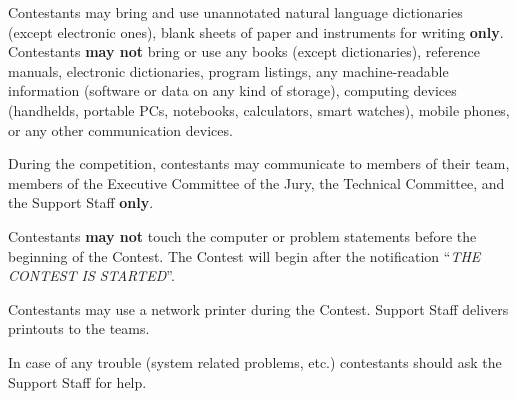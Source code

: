 
Contestants may bring and use unannotated natural language dictionaries
(except electronic ones), blank sheets of paper and instruments for writing
\textbf{only}.
Contestants \textbf{may not} bring or use any books (except dictionaries),
reference manuals, electronic dictionaries, program listings, any
machine-readable information (software or data on any kind of storage),
computing devices (handhelds, portable PCs, notebooks, calculators, smart watches),
mobile phones, or any other communication devices.

During the competition, contestants may communicate to members
of their team, members of the Executive Committee of the Jury, the
Technical Committee, and the Support Staff \textbf{only}.


Contestants \textbf{may not} touch the computer or problem statements
before the beginning of the Contest. The Contest will begin after the
notification ``\emph{THE CONTEST IS STARTED}''.

Contestants may use a network printer during the Contest.
Support Staff delivers printouts to the teams.

In case of any trouble (system related problems, etc.) contestants
should ask the Support Staff for help.

